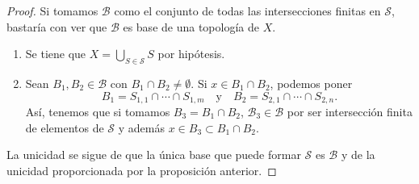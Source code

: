 \begin{proof}
	Si tomamos $\displaystyle \mathcal{B} $ como el conjunto de todas las intersecciones finitas en $\displaystyle \mathcal{S} $, bastaría con ver que $\displaystyle \mathcal{B} $ es base de una topología de $\displaystyle X $. 
	\begin{enumerate}
	\item Se tiene que $\displaystyle X = \bigcup_{S \in \mathcal{S}}S $ por hipótesis. 
	\item Sean $\displaystyle B_{1}, B_{2} \in \mathcal{B} $ con $\displaystyle B_{1} \cap B_{2}\neq \emptyset $. Si $\displaystyle x \in B_{1} \cap B_{2} $, podemos poner
		\[B_{1} = S_{1,1} \cap \cdots \cap S_{1,m} \quad \text{y} \quad B_{2}= S_{2,1} \cap \cdots \cap S_{2,n} .\]
		Así, tenemos que si tomamos $\displaystyle B_{3}=B_{1} \cap B_{2} $, $\displaystyle \mathcal{B}_{3}\in\mathcal{B} $ por ser intersección finita de elementos de $\displaystyle \mathcal{S} $ y además $\displaystyle x \in B_{3}\subset B_{1}\cap B_{2} $. 
\end{enumerate}
La unicidad se sigue de que la única base que puede formar $\displaystyle \mathcal{S} $ es $\displaystyle \mathcal{B} $ y de la unicidad proporcionada por la proposición anterior.
\end{proof}
